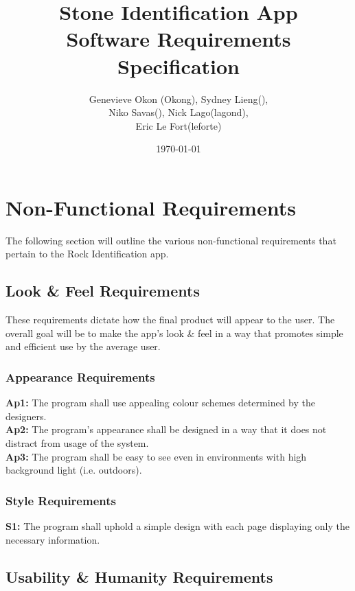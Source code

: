 \documentclass[titlepage]{article}
\begin{document}
\title{Stone Identification App \\
	Software Requirements Specification}
\author{Genevieve Okon (Okong), Sydney Lieng(),\\
	Niko Savas(), Nick Lago(lagond),\\
	Eric Le Fort(leforte)}
\date{\today}
\maketitle


\section{Non-Functional Requirements}
The following section will outline the various non-functional requirements that pertain to the Rock Identification app.

\subsection{Look \& Feel Requirements}
These requirements dictate how the final product will appear to the user. The overall goal will be to make the app's look \& feel in a way that promotes simple and efficient use by the average user.
\subsubsection{Appearance Requirements}
\textbf{Ap1:} The program shall use appealing colour schemes determined by the designers.\\

\noindent\textbf{Ap2:} The program's appearance shall be designed in a way that it does not distract from usage of the system.\\

\noindent\textbf{Ap3:} The program shall be easy to see even in environments with high background light (i.e. outdoors).

\subsubsection{Style Requirements}
\textbf{S1:} The program shall uphold a simple design with each page displaying only the necessary information.

\subsection{Usability \& Humanity Requirements}
\end{document}
